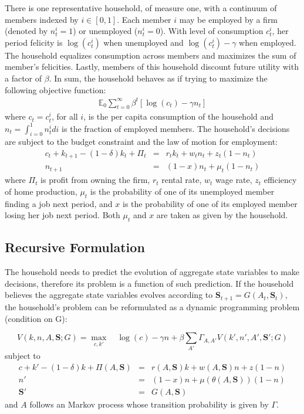 \documentclass[12pt]{article}
\begin{document}
There is one representative household, of measure one, with a continuum of members indexed by $i \in [0,1] $. Each member $i$ may be employed by a firm (denoted by $n^{i}_{t}=1$) or unemployed ($n^{i}_{t}=0$). With level of consumption $c^{i}_{t}$, her period felicity is $\log(c_{t}^{i}) $ when unemployed and $\log(c_{t}^{i})-\gamma$ when employed. The household equalizes consumption across members and maximizes the sum of member's felicities. Lastly, members of this household discount future utility with a factor of $\beta$. In sum, the household behaves as if trying to maximize the following objective function:
\begin{eqnarray}
\mathbb{E}_{0} \sum_{t=0}^{\infty} \beta^{t} \left[ \log(c_{t}) - \gamma n_{t} \right]
\end{eqnarray}
\noindent where $c_{t}=c_{t}^{i}$, for all $i$, is the per capita consumption of the household and $n_{t}=\int_{i=0}^1n^{i}_tdi$ is the fraction of  employed members. The household's decisions are subject to the budget constraint and the law of motion for employment:
\begin{eqnarray}
c_{t} + k_{t+1} - (1-\delta)k_{t} + \Pi_t &=& r_tk_{t} + w_tn_{t} + z_t (1-n_{t}) \\
n_{t+1} &=& (1-x)n_{t} + \mu_t(1-n_{t})
\end{eqnarray}
\noindent where $\Pi_t$ is profit from owning the firm, $r_t$ rental rate, $w_t$ wage rate, $z_t$ efficiency of home production, $\mu_t$ is the probability of one of its unemployed member finding a job next period, and $x$ is the probability of one of its employed member losing her job next period. Both $\mu_t$ and $x$ are taken as given by the household.


\subsection{Recursive Formulation}
The household needs to predict the evolution of aggregate state variables to make decisions, therefore its problem is a function of such prediction. If the household believes the aggregate state variables evolves according to $\mathbf{S}_{t+1} = G(A_{t},\mathbf{S}_{t})$, the household's problem can be reformulated as a dynamic programming problem (condition on G):
	
	\begin{equation}
	V(k,n,A,\mathbf{S};G) = \max_{c,k'} \quad \log(c) - \gamma n+\beta \sum_{A'} \Gamma_{A,A'} V(k',n',A',\mathbf{S'};G)
	\end{equation}
	subject to
	\begin{eqnarray}
	c + k' - (1-\delta)k + \Pi(A,\mathbf{S}) &=& r(A,\mathbf{S})k + w(A,\mathbf{S})n + z(1-n)  \\ 
	n' &=& (1-x)n + \mu(\theta(A,\mathbf{S}))(1-n)  \\
	\mathbf{S'} &=& G(A,\mathbf{S})
	\end{eqnarray}
	and $A$ follows an Markov process whose transition probability is given by $\Gamma$.
\end{document}
